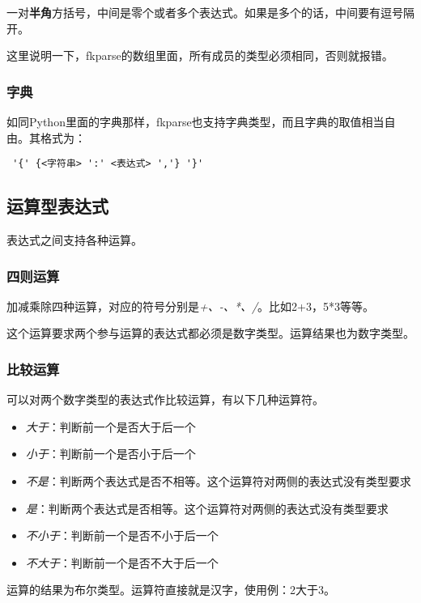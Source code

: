 一对\textbf{半角}方括号，中间是零个或者多个表达式。如果是多个的话，中间要有逗号隔开。

这里说明一下，fkparse的数组里面，所有成员的类型必须相同，否则就报错。

\subsubsection{字典}

如同Python里面的字典那样，fkparse也支持字典类型，而且字典的取值相当自由。其格式为：

\begin{verbatim}
 '{' {<字符串> ':' <表达式> ','} '}'
\end{verbatim}

\subsection{运算型表达式}

表达式之间支持各种运算。

\subsubsection{四则运算}

加减乘除四种运算，对应的符号分别是\emph{+、-、*、/}。比如2+3，5*3等等。

这个运算要求两个参与运算的表达式都必须是数字类型。运算结果也为数字类型。

\subsubsection{比较运算}

可以对两个数字类型的表达式作比较运算，有以下几种运算符。

\begin{itemize}
 \item \emph{大于}：判断前一个是否大于后一个
 \item \emph{小于}：判断前一个是否小于后一个
 \item \emph{不是}：判断两个表达式是否不相等。这个运算符对两侧的表达式没有类型要求
 \item \emph{是}：判断两个表达式是否相等。这个运算符对两侧的表达式没有类型要求
 \item \emph{不小于}：判断前一个是否不小于后一个
 \item \emph{不大于}：判断前一个是否不大于后一个
\end{itemize}

运算的结果为布尔类型。运算符直接就是汉字，使用例：2大于3。

